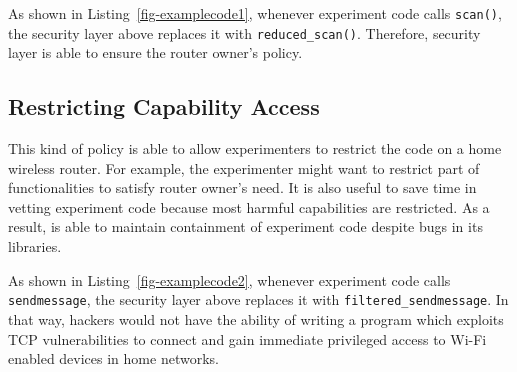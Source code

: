 

As shown in Listing~\ref{fig-examplecode1}, whenever experiment code calls \texttt{scan()}, the security layer above replaces it with \texttt{reduced\_scan()}. Therefore, security layer is able to ensure the router owner's policy.

\subsection{Restricting Capability Access}
This kind of policy is able to allow experimenters to restrict the code on a home wireless router. For example, the experimenter might want to restrict part of functionalities to satisfy router owner's need. It is also useful to save time in vetting experiment code because most harmful capabilities are restricted. As a result, \sysname is able to maintain containment of experiment code despite bugs in its libraries.



As shown in Listing~\ref{fig-examplecode2}, whenever experiment code calls \texttt{sendmessage}, the security layer above replaces it with \texttt{filtered\_sendmessage}. In that way, hackers would not have the ability of writing a program which exploits TCP vulnerabilities to connect and gain immediate privileged access to Wi-Fi enabled devices in home networks. 

 